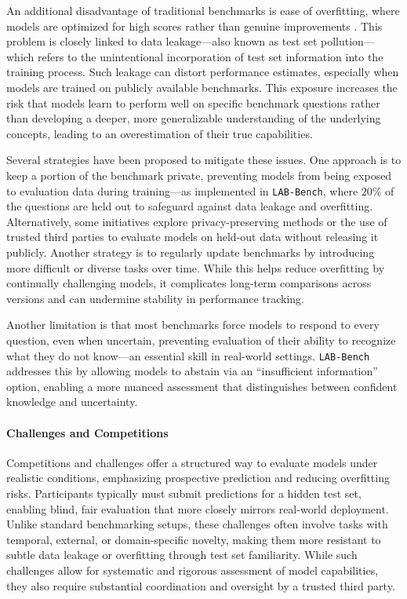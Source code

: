 \documentclass[11pt, oneside]{article}
\newcommand{\modelname}[1]{\texttt{#1}}
\providecommand{\DIFaddtex}[1]{{\protect\color{blue}\uwave{#1}}} %
\providecommand{\DIFaddbegin}{} %
\providecommand{\DIFaddend}{} %
\providecommand{\DIFadd}[1]{\texorpdfstring{\DIFaddtex{#1}}{#1}} %
\newcommand{\DIFaddincludegraphics}[2][]{{\color{blue}\fbox{\DIFOincludegraphics[#1]{#2}}}} %
\DeclareRobustCommand{\DIFaddbegin}{\DIFOaddbegin \let\includegraphics\DIFaddincludegraphics} %
\DeclareRobustCommand{\DIFaddend}{\DIFOaddend \let\includegraphics\DIFOincludegraphics} %
\begin{document}
An additional disadvantage of traditional benchmarks is ease of overfitting, where models are optimized for high scores rather than genuine improvements \DIFaddbegin \DIFadd{in real-world applications}\DIFaddend . 
This problem is closely linked to data leakage---also known as test set pollution---which refers to the unintentional incorporation of test set information into the training process. Such leakage can distort performance estimates, especially when models are trained on publicly available benchmarks.\autocite{thompson2025chatbots}
This exposure increases the risk that models learn to perform well on specific benchmark questions rather than developing a deeper, more generalizable understanding of the underlying concepts, leading to an overestimation of their true capabilities. 

Several strategies have been proposed to mitigate these issues. One approach is to keep a portion of the benchmark private, preventing models from being exposed to evaluation data during training---as implemented in \modelname{LAB-Bench}, where $20\%$ of the questions are held out to safeguard against data leakage and overfitting.\autocite{laurent2024lab0bench0} 
Alternatively, some initiatives explore privacy-preserving methods or the use of trusted third parties to evaluate models on held-out data without releasing it publicly. \autocite{eleutherai2024thirdparty}
Another strategy is to regularly update benchmarks by introducing more difficult or diverse tasks over time. \autocite{jimenez2023swe} 
While this helps reduce overfitting by continually challenging models, it complicates long-term comparisons across versions and can undermine stability in performance tracking. \autocite{alampara2025lessons}

Another limitation is that most benchmarks force models to respond to every question, even when uncertain, preventing evaluation of their ability to recognize what they do not know---an essential skill in real-world settings. \modelname{LAB-Bench} addresses this by allowing models to abstain via an \enquote{insufficient information} option, enabling a more nuanced assessment that distinguishes between confident knowledge and uncertainty.


\paragraph{Challenges and Competitions}
Competitions and challenges offer a structured way to evaluate models under realistic conditions, emphasizing prospective prediction and reducing overfitting risks.\autocite{Moult2005} 
Participants typically must submit predictions for a hidden test set, enabling blind, fair evaluation that more closely mirrors real-world deployment. Unlike standard benchmarking setups, these challenges often involve tasks with temporal, external, or domain-specific novelty, making them more resistant to subtle data leakage or overfitting through test set familiarity. 
While such challenges allow for systematic and rigorous assessment of model capabilities, they also require substantial coordination and oversight by a trusted third party.
\end{document}
